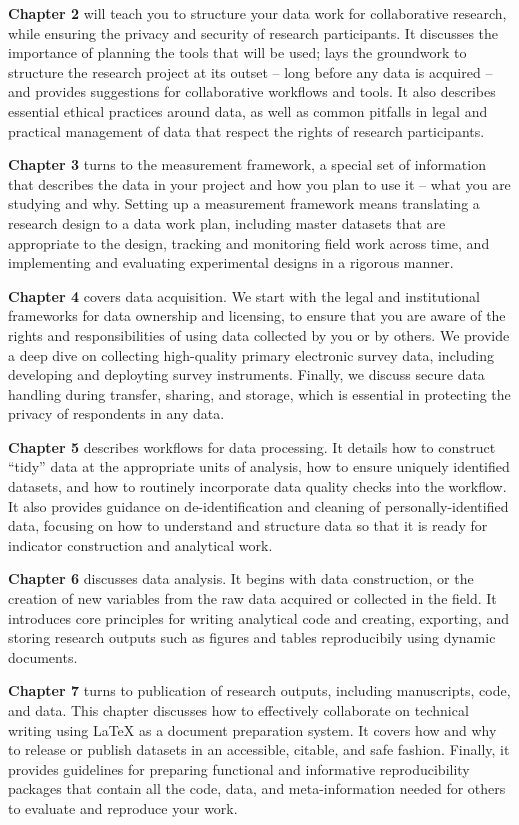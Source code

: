 \textbf{Chapter 2} will teach you to structure your data work for collaborative research,
while ensuring the privacy and security of research participants.
It discusses the importance of planning the tools that will be used;
lays the groundwork to structure the research project at its outset --
long before any data is acquired --
and provides suggestions for collaborative workflows and tools.
It also describes essential ethical practices around data,
as well as common pitfalls in legal and practical management of data
that respect the rights of research participants.

\textbf{Chapter 3} turns to the measurement framework,
a special set of information that describes the data in your project
and how you plan to use it -- what you are studying and why.
Setting up a measurement framework means translating a research design to a data work plan,
including master datasets that are appropriate to the design,
tracking and monitoring field work across time,
and implementing and evaluating experimental designs in a rigorous manner.

\textbf{Chapter 4} covers data acquisition. We start with
the legal and institutional frameworks for data ownership and licensing,
to ensure that you are aware of the rights and responsibilities
of using data collected by you or by others.
We provide a deep dive on collecting high-quality primary electronic survey data,
including developing and deployting survey instruments.
Finally, we discuss secure data handling during transfer, sharing, and storage,
which is essential in protecting the privacy of respondents in any data.

\textbf{Chapter 5} describes workflows for data processing.
It details how to construct ``tidy'' data at the appropriate units of analysis,
how to ensure uniquely identified datasets, and
how to routinely incorporate data quality checks into the workflow.
It also provides guidance on de-identification and cleaning of personally-identified data,
focusing on how to understand and structure data
so that it is ready for indicator construction and analytical work.

\textbf{Chapter 6} discusses data analysis.
It begins with data construction, or the creation of new variables
from the raw data acquired or collected in the field.
It introduces core principles for writing analytical code
and creating, exporting, and storing research outputs
such as figures and tables reproducibily using dynamic documents.

\textbf{Chapter 7} turns to publication of research outputs,
including manuscripts, code, and data.
This chapter discusses
how to effectively collaborate on technical writing
using {\LaTeX} as a document preparation system.
It covers how and why to release or publish datasets
in an accessible, citable, and safe fashion.
Finally, it provides guidelines for preparing
functional and informative reproducibility packages
that contain all the code, data, and meta-information needed
for others to evaluate and reproduce your work.

